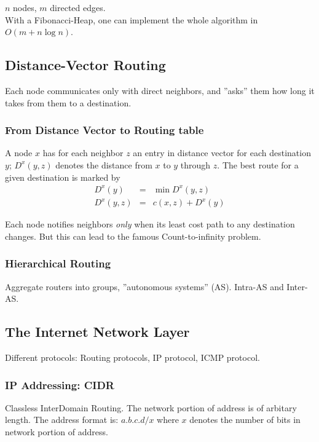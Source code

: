 \documentclass[10pt, a4paper, twocolumn]{scrartcl}
\begin{document}
$n$ nodes, $m$ directed edges.\\

With a Fibonacci-Heap, one can implement the whole algorithm in $O(m+n\log n)$.

\subsection{Distance-Vector Routing}

Each node communicates only with direct neighbors, and ''asks'' them how long it takes from them to a destination.

\subsubsection{From Distance Vector to Routing table}

A node $x$ has for each neighbor $z$ an entry in distance vector for each destination $y$; $D^x(y,z)$ denotes the distance from $x$ to $y$ through $z$. The best route for a given destination is marked by
\begin{eqnarray}
	D^x(y) &	= &	\min D^x (y,z) \nonumber\\
	D^x(y,z) &	= &	c(x,z) + D^x(y) \nonumber
\end{eqnarray}

Each node notifies neighbors \textit{only} when its least cost path to any destination changes. But this can lead to the famous Count-to-infinity problem.

\subsubsection{Hierarchical Routing}

Aggregate routers into groups, ''autonomous systems'' (AS). Intra-AS and Inter-AS.

\subsection{The Internet Network Layer}

Different protocols: Routing protocols, IP protocol, ICMP protocol.

\subsubsection{IP Addressing: CIDR}

Classless InterDomain Routing. The network portion of address is of arbitary length. The address format is: $a.b.c.d/x$ where $x$ denotes the number of bits in network portion of address.\\
\end{document}
